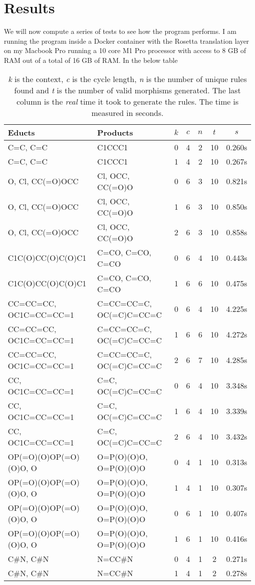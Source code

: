 \documentclass{article}
\begin{document}
\section{Results}
We will now compute a series of tests to see how the program performs. I am running the program inside a Docker container with the Rosetta translation layer on my Macbook Pro running a 10 core M1 Pro processor with access to 8 GB of RAM out of a total of 16 GB of RAM. In the below table  
\begin{table}[h]
    \centering
    \begin{tabular}{ll|ccccc}\\
        Educts & Products & $k$ & $c$ & $n$ & $t$ & $s$\\\hline
        C=C, C=C & C1CCC1 & 0 & 4 & 2 & 10 & 0.260s\\
        C=C, C=C & C1CCC1 & 1 & 4 & 2 & 10 & 0.267s\\
        O, Cl, CC(=O)OCC & Cl, OCC, CC(=O)O & 0 & 6 & 3 & 10 & 0.821s\\
        O, Cl, CC(=O)OCC & Cl, OCC, CC(=O)O & 1 & 6 & 3 & 10 & 0.850s\\
        O, Cl, CC(=O)OCC & Cl, OCC, CC(=O)O & 2 & 6 & 3 & 10 & 0.858s\\
        C1C(O)CC(O)C(O)C1 & C=CO, C=CO, C=CO  & 0 & 6 & 4 & 10 & 0.443s\\
        C1C(O)CC(O)C(O)C1 & C=CO, C=CO, C=CO  & 1 & 6 & 6 & 10 & 0.475s\\
        CC=CC=CC, OC1C=CC=CC=1 & C=CC=CC=C, OC(=C)C=CC=C & 0 & 6 & 4 & 10 & 4.225s\\
        CC=CC=CC, OC1C=CC=CC=1 & C=CC=CC=C, OC(=C)C=CC=C & 1 & 6 & 6 & 10 & 4.272s\\
        CC=CC=CC, OC1C=CC=CC=1 & C=CC=CC=C, OC(=C)C=CC=C & 2 & 6 & 7 & 10 & 4.285s\\
        CC, OC1C=CC=CC=1 & C=C, OC(=C)C=CC=C & 0 & 6 & 4 & 10 & 3.348s\\
        CC, OC1C=CC=CC=1 & C=C, OC(=C)C=CC=C & 1 & 6 & 4 & 10 & 3.339s\\
        CC, OC1C=CC=CC=1 & C=C, OC(=C)C=CC=C & 2 & 6 & 4 & 10 & 3.432s\\
        OP(=O)(O)OP(=O)(O)O, O & O=P(O)(O)O, O=P(O)(O)O  & 0 & 4 & 1 & 10 & 0.313s\\
        OP(=O)(O)OP(=O)(O)O, O & O=P(O)(O)O, O=P(O)(O)O  & 1 & 4 & 1 & 10 & 0.307s\\
        OP(=O)(O)OP(=O)(O)O, O & O=P(O)(O)O, O=P(O)(O)O  & 0 & 6 & 1 & 10 & 0.407s\\
        OP(=O)(O)OP(=O)(O)O, O & O=P(O)(O)O, O=P(O)(O)O  & 1 & 6 & 1 & 10 & 0.416s\\
        C\#N, C\#N & N=CC\#N & 0 & 4 & 1 & 2 & 0.271s\\
        C\#N, C\#N & N=CC\#N & 1 & 4 & 1 & 2 & 0.278s\\
    \end{tabular}
    \caption{
        \textit{k} is the context, \textit{c} is the cycle length, \textit{n} is the number of unique rules found and \textit{t} is  the number of valid morphisms generated. The last column is the \textit{real} time it took to generate the rules. The time is measured in seconds.
    }
    
\end{table}
\newpage
\end{document}
